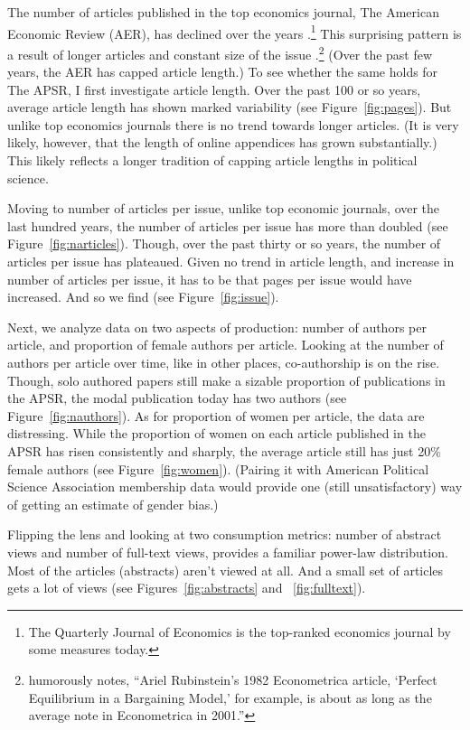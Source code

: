 \documentclass[12pt]{article}
\begin{document}
The number of articles published in the top economics journal, The American Economic Review (AER), has declined over the years \citep{card2014page}.\footnote{The Quarterly Journal of Economics is the top-ranked economics journal by some measures today.} This surprising pattern is a result of longer articles and constant size of the issue \citep{card2014page}.\footnote{\citet{ellison2000evolving} humorously notes, ``Ariel Rubinstein's 1982 Econometrica article, `Perfect Equilibrium in a Bargaining Model,' for example, is about as long as the average note in Econometrica in 2001.''} (Over the past few years, the AER has capped article length.) To see whether the same holds for The APSR, I first investigate article length. Over the past 100 or so years, average article length has shown marked variability (see Figure~\ref{fig:pages}). But unlike top economics journals there is no trend towards longer articles. (It is very likely, however, that the length of online appendices has grown substantially.) This likely reflects a longer tradition of capping article lengths in political science.

Moving to number of articles per issue, unlike top economic journals, over the last hundred years, the number of articles per issue has more than doubled (see Figure~\ref{fig:narticles}). Though, over the past thirty or so years, the number of articles per issue has plateaued. Given no trend in article length, and increase in number of articles per issue, it has to be that pages per issue would have increased. And so we find (see Figure~\ref{fig:issue}). 

Next, we analyze data on two aspects of production: number of authors per article, and proportion of female authors per article. Looking at the number of authors per article over time, like in other places, co-authorship is on the rise. Though, solo authored papers still make a sizable proportion of publications in the APSR, the modal publication today has two authors (see Figure~\ref{fig:nauthors}). As for proportion of women per article, the data are distressing. While the proportion of women on each article published in the APSR has risen consistently and sharply, the average article still has just 20\% female authors (see Figure~\ref{fig:women}). (Pairing it with American Political Science Association membership data would provide one (still unsatisfactory) way of getting an estimate of gender bias.)

Flipping the lens and looking at two consumption metrics: number of abstract views and number of full-text views, provides a familiar power-law distribution. Most of the articles (abstracts) aren't viewed at all. And a small set of articles gets a lot of views (see Figures~\ref{fig:abstracts} and ~\ref{fig:fulltext}).
\end{document}
